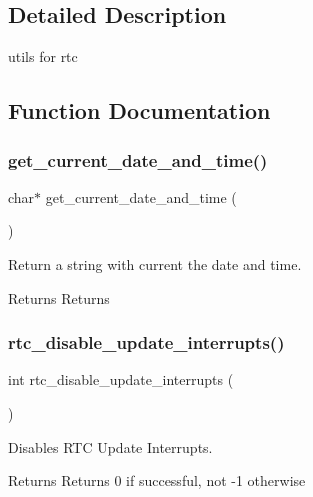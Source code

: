\subsection{Detailed Description}
utils for rtc 

\subsection{Function Documentation}
\mbox{\label{group__rtc_ga42d5a1a9ae07d38ec73c43499ec429ee}} 
\subsubsection{\texorpdfstring{get\_current\_date\_and\_time()}{get\_current\_date\_and\_time()}}
{\footnotesize\ttfamily char$\ast$ get\+\_\+current\+\_\+date\+\_\+and\+\_\+time (\begin{DoxyParamCaption}{ }\end{DoxyParamCaption})}



Return a string with current the date and time. 

\begin{DoxyReturn}{Returns}
Returns 
\end{DoxyReturn}
\mbox{\label{group__rtc_ga71a212cd88a2e2b09096d345a86c1eb8}} 
\subsubsection{\texorpdfstring{rtc\_disable\_update\_interrupts()}{rtc\_disable\_update\_interrupts()}}
{\footnotesize\ttfamily int rtc\+\_\+disable\+\_\+update\+\_\+interrupts (\begin{DoxyParamCaption}{ }\end{DoxyParamCaption})}



Disables R\+TC Update Interrupts. 

\begin{DoxyReturn}{Returns}
Returns 0 if successful, not -\/1 otherwise 
\end{DoxyReturn}
\mbox{\label{group__rtc_ga1d3c9242fe8175549f6b898cf55582fd}} 
